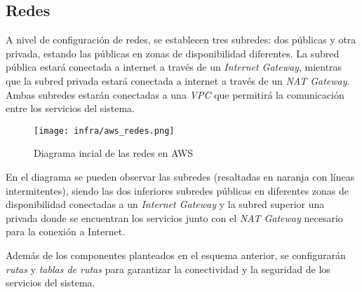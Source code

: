 \newpage{}
\subsection{Redes}\label{subsec:redes}
A nivel de configuración de redes, se establecen tres subredes: dos públicas y
otra privada, estando las públicas en zonas de disponibilidad diferentes. La
subred pública estará conectada a internet a través de un
\textit{Internet Gateway}, mientras que la subred privada estará conectada a
internet a través de un \textit{NAT Gateway}. Ambas subredes estarán conectadas
a una \textit{VPC} que permitirá la comunicación entre los servicios del
sistema.

\begin{figure}[H]
	\centerline{\texttt{[image: infra/aws\_redes.png]}}
	\caption{Diagrama incial de las redes en AWS}
	\label{fig:aws_redes}
\end{figure}

En el diagrama se pueden observar las subredes (resaltadas en naranja con líneas
intermitentes), siendo las dos inferiores subredes públicas en diferentes zonas
de disponibilidad conectadas a un \textit{Internet Gateway} y la subred superior
una privada donde se encuentran los servicios junto con el \textit{NAT Gateway}
necesario para la conexión a Internet.

Además de los componentes planteados en el esquema anterior, se configurarán
\textit{rutas} y \textit{tablas de rutas} para garantizar la conectividad y la
seguridad de los servicios del sistema.
